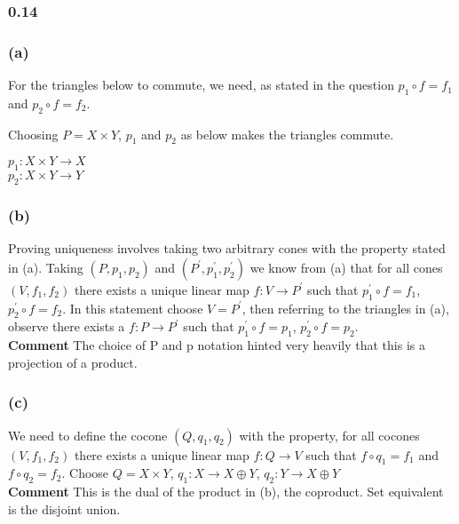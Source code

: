 \documentclass{article}
\begin{document}
\subsubsection*{0.14}
\subsubsection*{(a)}

For the triangles below to commute, we need, as stated in the question $p_1 \circ f = f_1$ and $p_2 \circ f = f_2$.\\
\begin{center}

 \break\hfill

\end{center}
Choosing $P=X\times{Y}$, $p_1$ and $p_2$ as below makes the triangles commute.
\begin{center}
$p_1: X\times{Y} \rightarrow X$ \\
$p_2: X\times{Y} \rightarrow Y$
\end{center}

\subsubsection*{(b)}

Proving uniqueness involves taking two arbitrary cones with the property stated in (a).
Taking $(P, p_1, p_2)$ and $(P^\prime, p_1^\prime, p_2^\prime)$
we know from (a) that for all cones $(V, f_1, f_2)$ there exists a unique linear map $f: V \rightarrow P^\prime$ such that $p_1^\prime \circ f = f_1$, $p_2^\prime \circ f = f_2$.
In this statement choose $V=P^\prime$, then referring to the triangles in (a), observe there exists a $f: P \rightarrow P^\prime$ such that $p_1^\prime \circ f = p_1$, $p_2^\prime \circ f = p_2$.\\

\textbf{Comment} The choice of P and p notation hinted very heavily that this is a projection of a product.

\subsubsection*{(c)}

We need to define the cocone $(Q, q_1, q_2)$ with the property, for all cocones $(V, f_1, f_2)$ there exists a unique linear map $f: Q \rightarrow V$ such that $f \circ q_1 = f_1$ and $f \circ q_2 = f_2$. Choose $Q= X \times Y$, $q_1: X \rightarrow X \oplus Y$, $q_2: Y \rightarrow X \oplus Y$ \\

\textbf{Comment} This is the dual of the product in (b), the coproduct. Set equivalent is the disjoint union.
\end{document}
